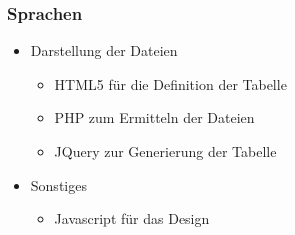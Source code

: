 \begin{frame} %
  \frametitle{Sprachen} %

   \begin{itemize}
    \item Darstellung der Dateien
\bigskip
    \begin{itemize}
     \item HTML5 für die Definition der Tabelle
     \item PHP zum Ermitteln der Dateien
     \item JQuery zur Generierung der Tabelle
    \end{itemize}
\bigskip
    \item Sonstiges
\bigskip
    \begin{itemize}
     \item Javascript für das Design
    \end{itemize}

   \end{itemize}

\end{frame}
%
%
%
%
%
